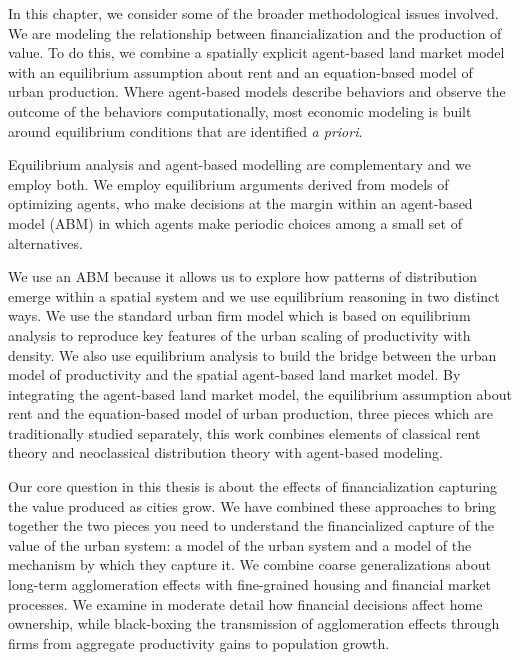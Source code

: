 In this chapter, we consider some of the broader methodological issues involved. We are modeling the relationship between financialization and the production of value. To do this, we combine a spatially explicit agent-based land market model with an equilibrium assumption about rent and an equation-based model of urban production. Where agent-based models describe behaviors and observe the outcome of the behaviors computationally, most economic modeling is built around equilibrium conditions that are identified \textit{a priori}. 

Equilibrium analysis and agent-based modelling are complementary and we employ both. We employ equilibrium arguments derived from models of optimizing agents, who make decisions at the margin within an agent-based model (ABM) in which agents make periodic choices among a small set of alternatives. 

We use an ABM because it allows us to explore how patterns of distribution emerge within a spatial system and we use \gls{equilibrium reasoning} in two distinct ways. We use the standard urban firm model which is based on equilibrium analysis to reproduce key features of the urban scaling of productivity with density. We also use equilibrium analysis to build the bridge between the urban model of productivity and the spatial agent-based land market model. By integrating the agent-based land market model, the equilibrium assumption about rent and the equation-based model of urban production, three pieces which are traditionally studied separately, this work combines elements of classical rent theory and neoclassical distribution theory with agent-based modeling.

Our core question in this thesis is about the effects of financialization capturing the value produced as cities grow. We have combined these  approaches to bring together the two pieces you need to understand the financialized capture of the value of the urban system: a model of the urban system and a model of the mechanism by which they capture it. We combine coarse generalizations about long-term agglomeration effects with fine-grained housing and financial market processes. We examine in moderate detail how financial decisions affect home ownership, while black-boxing the transmission of agglomeration effects through firms from aggregate productivity gains to population growth. 


